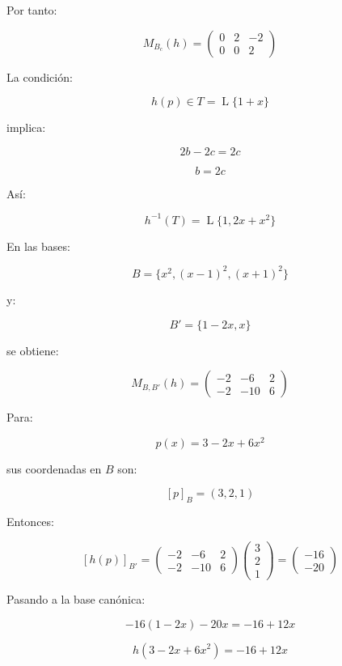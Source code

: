 \documentclass[11pt,a4paper]{article}
\newcommand{\Span}{\operatorname{L}}
\begin{document}
	Por tanto:

	\[
	M_{B_c}(h)
	=
	\begin{pmatrix}
	0&2&-2\\
	0&0&2
	\end{pmatrix}
	\]

	La condición:

	\[
	h(p)\in T=\Span\{1+x\}
	\]

	implica:

	\[
	2b-2c=2c
	\]

	\[
	b=2c
	\]

	Así:

	\[
	\boxed{
	h^{-1}(T)
	=
	\Span\{1,2x+x^2\}
	}
	\]

	En las bases:

	\[
	B=\{x^2,(x-1)^2,(x+1)^2\}
	\]

	y:

	\[
	B'=\{1-2x,x\}
	\]

	se obtiene:

	\[
	\boxed{
	M_{B,B'}(h)
	=
	\begin{pmatrix}
	-2&-6&2\\
	-2&-10&6
	\end{pmatrix}
	}
	\]

	Para:

	\[
	p(x)=3-2x+6x^2
	\]

	sus coordenadas en $B$ son:

	\[
	[p]_B=(3,2,1)
	\]

	Entonces:

	\[
	[h(p)]_{B'}
	=
	\begin{pmatrix}
	-2&-6&2\\
	-2&-10&6
	\end{pmatrix}
	\begin{pmatrix}
	3\\2\\1
	\end{pmatrix}
	=
	\begin{pmatrix}
	-16\\-20
	\end{pmatrix}
	\]

	Pasando a la base canónica:

	\[
	-16(1-2x)-20x
	=
	-16+12x
	\]

	\[
	\boxed{
	h(3-2x+6x^2)
	=
	-16+12x
	}
	\]
\end{document}
